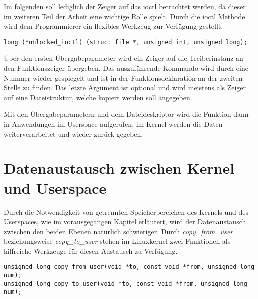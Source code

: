 Im folgenden soll lediglich der Zeiger auf das \acf{ioctl} betrachtet werden, da dieser im weiteren Teil der Arbeit eine wichtige Rolle spielt.
Durch die \ac{ioctl} Methode wird dem Programmierer ein flexibles Werkzeug zur Verfügung gestellt. 

\begin{lstfloat}
\begin{lstlisting}
long (*unlocked_ioctl) (struct file *, unsigned int, unsigned long);
\end{lstlisting}
\end{lstfloat}

Über den ersten Übergabeparameter wird ein Zeiger auf die Treiberinstanz an den Funktionszeiger übergeben. Das auszuführende Kommando wird durch eine Nummer wieder gespiegelt und ist in der Funktionsdeklaration an der zweiten Stelle zu finden. Das letzte Argument ist optional und wird meistens als Zeiger auf eine Dateistruktur, welche kopiert werden soll angegeben. \citep[S. 90f]{corbet2005linux} 

Mit den Übergabeparametern und dem Dateideskriptor wird die Funktion dann in Anwendungen im Userspace aufgerufen, im Kernel werden die Daten weiterverarbeitet und wieder zurück gegeben.

\section{Datenaustausch zwischen Kernel und Userspace}
Durch die Notwendigkeit von getrennten Speicherbereichen des Kernels und des Userspaces, wie im vorausgegangen Kapitel erläutert, wird der Datenaustausch zwischen den beiden Ebenen natürlich schwieriger. Durch \textit{copy\_from\_user} beziehungsweise \textit{copy\_to\_user} stehen im Linuxkernel zwei Funktionen als hilfreiche Werkzeuge für diesen Austausch zu Verfügung.

\begin{lstfloat}
\begin{lstlisting}
unsigned long copy_from_user(void *to, const void *from, unsigned long num);
unsigned long copy_to_user(void *to, const void *from, unsigned long num);
\end{lstlisting}
\end{lstfloat}

